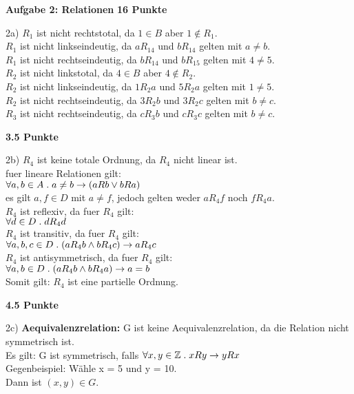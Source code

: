 \documentclass[twoside,10pt,fleqn,headinclude=false]{scrartcl}
\begin{document}
\textbf{Aufgabe 2: Relationen} \hfill \textbf{16 Punkte}
\begin{compactenum}
	\item[2a)] $R_1$ ist nicht rechtstotal, da $1 \in B$ aber $1 \notin R_1$.\\
	$R_1$ ist nicht linkseindeutig, da $aR_14$ und $bR_14$ gelten mit $a \neq b$.\\
	$R_1$ ist nicht rechtseindeutig, da $bR_14$ und $bR_15$ gelten mit $4 \neq 5$.\\
	$R_2$ ist nicht linkstotal, da $4 \in B$ aber $4 \notin R_2$.\\
	$R_2$ ist nicht linkseindeutig, da $1R_2a$ und $5R_2a$ gelten mit $1 \neq 5$.\\
	$R_2$ ist nicht rechtseindeutig, da $3R_2b$ und $3R_2c$ gelten mit $b \neq c$.\\ 
	$R_3$ ist nicht rechtseindeutig, da $cR_3b$ und $cR_3c$ gelten mit $b \neq c$.\\ 
	\item[] \hfill \textbf{3.5 Punkte}
	\item[2b)] $R_4$ ist keine totale Ordnung, da $R_4$ nicht linear ist.\\
	fuer lineare Relationen gilt:\\
	$\AllQ{a,b \in A}{a \neq b \rightarrow (aRb \lor bRa)}$\\
	es gilt $a,f \in D$ mit $a \neq f$, jedoch gelten weder $aR_4f$ noch $fR_4a$.\\
	$R_4$ ist reflexiv, da fuer $R_4$ gilt:\\
	$\AllQ{d \in D}{dR_4d}$\\
	$R_4$ ist transitiv, da fuer $R_4$ gilt:\\
	$\AllQ{a,b,c \in D}{(aR_4b \land bR_4c) \rightarrow aR_4c}$\\
	$R_4$ ist antisymmetrisch, da fuer $R_4$ gilt:\\
	$\AllQ{a,b \in D}{(aR_4b \land bR_4a) \rightarrow a = b}$\\
	Somit gilt: $R_4$ ist eine partielle Ordnung.
	\item[] \hfill \textbf{4.5 Punkte}
	\item[2c)]\textbf{Aequivalenzrelation:} 
	G ist keine Aequivalenzrelation, da die Relation nicht symmetrisch ist. \\
	Es gilt: G ist symmetrisch, falls $\AllQ{x,y \in \mathbb{Z}}{xRy \rightarrow yRx} $\\
	Gegenbeispiel: Wähle x = 5 und y = 10. \\
	Dann ist $(x,y)\in G.$ \\

\end{compactenum}
\end{document}
